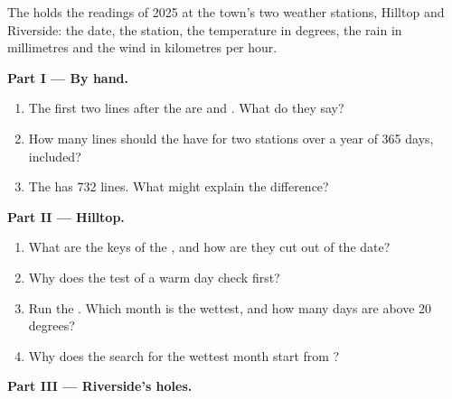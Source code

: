 \begin{problem}\label{pb:g8:files-and-data-tables:1}
The   holds the readings of 2025 at the town's two
weather stations, Hilltop and Riverside: the date, the station, the
temperature in degrees, the rain in millimetres and the wind in kilometres
per hour.

\medskip\noindent\textbf{Part I --- By hand.}
\begin{enumerate}
  \item The first two lines after the  are
     and
    . What do they say?
  \item How many lines should the  have for two stations over a year of
    365 days,  included?
  \item The  has 732 lines. What might explain the difference?
\end{enumerate}

\medskip\noindent\textbf{Part II --- Hilltop.}

\label{lst:g8:files-and-data-tables:weather-year}

\begin{enumerate}[resume]
  \item What are the keys of the  , and how are they cut
    out of the date?
  \item Why does the test of a warm day check 
    first?
  \item Run the . Which month is the wettest, and how many days are
    above 20 degrees?
  \item Why does the search for the wettest month start from ?
\end{enumerate}

\medskip\noindent\textbf{Part III --- Riverside's holes.}

\label{lst:g8:files-and-data-tables:defects}


\end{problem}
